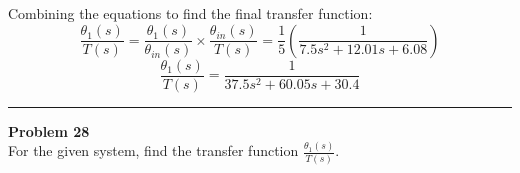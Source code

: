 \documentclass[11pt]{article}
\begin{document}
Combining the equations to find the final transfer function:
\begin{equation*}
 \frac{\theta_1(s)}{T(s)} = \frac{\theta_1(s)}{\theta_{in}(s)} \times \frac{\theta_{in}(s)}{T(s)} = \frac{1}{5} \left( \frac{1}{7.5s^2 + 12.01s + 6.08} \right)
\end{equation*}
\begin{equation*}
 \boxed{
 \frac{\theta_1(s)}{T(s)} = \frac{1}{37.5s^2 + 60.05s + 30.4}
 }
\end{equation*}




\newpage
  \setcounter{page}{56}  
\noindent\rule{\textwidth}{1pt}
\noindent\textbf{Problem 28} \hfill 
\\ For the given system, find the transfer function $\frac{\theta_1(s)}{T(s)}$.
\end{document}
